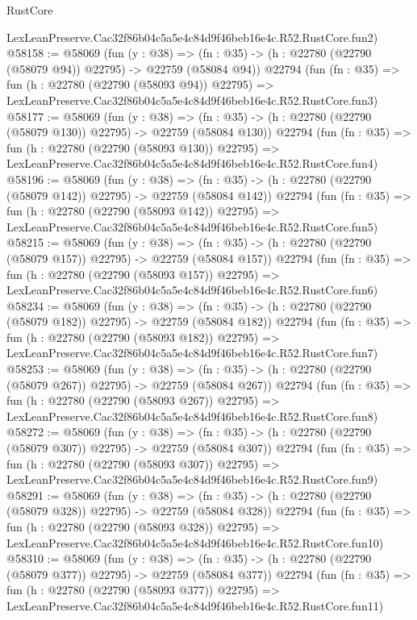 \begin{lexlean}{RustCore}
\begin{coremodule}
    LexLeanPreserve.Cac32f86b04c5a5e4c84d9f46beb16e4c.R52.RustCore.fun2)
@58158 := @58069
    (fun (y : @38) =>
    (fn : @35) -> (h : @22780 (@22790 (@58079 @94)) @22795) -> @22759 (@58084 @94))
    @22794
    (fun (fn : @35) =>
    fun (h : @22780 (@22790 (@58093 @94)) @22795) =>
    LexLeanPreserve.Cac32f86b04c5a5e4c84d9f46beb16e4c.R52.RustCore.fun3)
@58177 := @58069
    (fun (y : @38) =>
    (fn : @35) -> (h : @22780 (@22790 (@58079 @130)) @22795) -> @22759 (@58084 @130))
    @22794
    (fun (fn : @35) =>
    fun (h : @22780 (@22790 (@58093 @130)) @22795) =>
    LexLeanPreserve.Cac32f86b04c5a5e4c84d9f46beb16e4c.R52.RustCore.fun4)
@58196 := @58069
    (fun (y : @38) =>
    (fn : @35) -> (h : @22780 (@22790 (@58079 @142)) @22795) -> @22759 (@58084 @142))
    @22794
    (fun (fn : @35) =>
    fun (h : @22780 (@22790 (@58093 @142)) @22795) =>
    LexLeanPreserve.Cac32f86b04c5a5e4c84d9f46beb16e4c.R52.RustCore.fun5)
@58215 := @58069
    (fun (y : @38) =>
    (fn : @35) -> (h : @22780 (@22790 (@58079 @157)) @22795) -> @22759 (@58084 @157))
    @22794
    (fun (fn : @35) =>
    fun (h : @22780 (@22790 (@58093 @157)) @22795) =>
    LexLeanPreserve.Cac32f86b04c5a5e4c84d9f46beb16e4c.R52.RustCore.fun6)
@58234 := @58069
    (fun (y : @38) =>
    (fn : @35) -> (h : @22780 (@22790 (@58079 @182)) @22795) -> @22759 (@58084 @182))
    @22794
    (fun (fn : @35) =>
    fun (h : @22780 (@22790 (@58093 @182)) @22795) =>
    LexLeanPreserve.Cac32f86b04c5a5e4c84d9f46beb16e4c.R52.RustCore.fun7)
@58253 := @58069
    (fun (y : @38) =>
    (fn : @35) -> (h : @22780 (@22790 (@58079 @267)) @22795) -> @22759 (@58084 @267))
    @22794
    (fun (fn : @35) =>
    fun (h : @22780 (@22790 (@58093 @267)) @22795) =>
    LexLeanPreserve.Cac32f86b04c5a5e4c84d9f46beb16e4c.R52.RustCore.fun8)
@58272 := @58069
    (fun (y : @38) =>
    (fn : @35) -> (h : @22780 (@22790 (@58079 @307)) @22795) -> @22759 (@58084 @307))
    @22794
    (fun (fn : @35) =>
    fun (h : @22780 (@22790 (@58093 @307)) @22795) =>
    LexLeanPreserve.Cac32f86b04c5a5e4c84d9f46beb16e4c.R52.RustCore.fun9)
@58291 := @58069
    (fun (y : @38) =>
    (fn : @35) -> (h : @22780 (@22790 (@58079 @328)) @22795) -> @22759 (@58084 @328))
    @22794
    (fun (fn : @35) =>
    fun (h : @22780 (@22790 (@58093 @328)) @22795) =>
    LexLeanPreserve.Cac32f86b04c5a5e4c84d9f46beb16e4c.R52.RustCore.fun10)
@58310 := @58069
    (fun (y : @38) =>
    (fn : @35) -> (h : @22780 (@22790 (@58079 @377)) @22795) -> @22759 (@58084 @377))
    @22794
    (fun (fn : @35) =>
    fun (h : @22780 (@22790 (@58093 @377)) @22795) =>
    LexLeanPreserve.Cac32f86b04c5a5e4c84d9f46beb16e4c.R52.RustCore.fun11)

\end{coremodule}
\end{lexlean}
